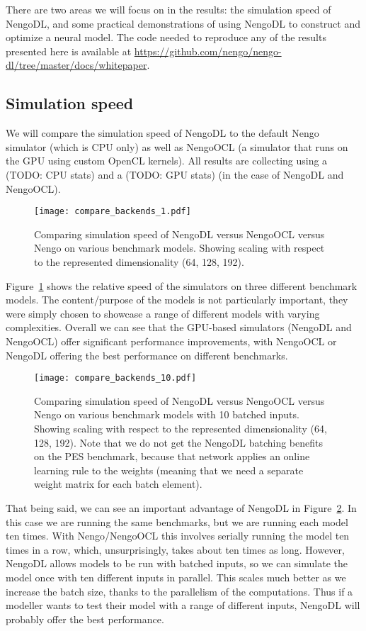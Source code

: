 \documentclass{article}
\begin{document}
There are two areas we will focus on in the results: the simulation speed of NengoDL, and some practical demonstrations of using NengoDL to construct and optimize a neural model.  The code needed to reproduce any of the results presented here is available at \url{https://github.com/nengo/nengo-dl/tree/master/docs/whitepaper}. 

\subsection{Simulation speed}

We will compare the simulation speed of NengoDL to the default Nengo simulator (which is CPU only) as well as NengoOCL (a simulator that runs on the GPU using custom OpenCL kernels).  All results are collecting using a (TODO: CPU stats) and a (TODO: GPU stats) (in the case of NengoDL and NengoOCL).

\begin{figure}
\centering
\texttt{[image: compare\_backends\_1.pdf]}
\caption{Comparing simulation speed of NengoDL versus NengoOCL versus Nengo on various benchmark models.  Showing scaling with respect to the represented dimensionality (64, 128, 192).}
\label{fig:compare_backends_1}
\end{figure}

Figure~\ref{fig:compare_backends_1} shows the relative speed of the simulators on three different benchmark models.  The content/purpose of the models is not particularly important, they were simply chosen to showcase a range of different models with varying complexities.  Overall we can see that the GPU-based simulators (NengoDL and NengoOCL) offer significant performance improvements, with NengoOCL or NengoDL offering the best performance on different benchmarks.

\begin{figure}
\centering
\texttt{[image: compare\_backends\_10.pdf]}
\caption{Comparing simulation speed of NengoDL versus NengoOCL versus Nengo on various benchmark models with 10 batched inputs.  Showing scaling with respect to the represented dimensionality (64, 128, 192).  Note that we do not get the NengoDL batching benefits on the PES benchmark, because that network applies an online learning rule to the weights (meaning that we need a separate weight matrix for each batch element).}
\label{fig:compare_backends_10}
\end{figure}

That being said, we can see an important advantage of NengoDL in Figure~\ref{fig:compare_backends_10}.  In this case we are running the same benchmarks, but we are running each model ten times.  With Nengo/NengoOCL this involves serially running the model ten times in a row, which, unsurprisingly, takes about ten times as long.  However, NengoDL allows models to be run with batched inputs, so we can simulate the model once with ten different inputs in parallel.  This scales much better as we increase the batch size, thanks to the parallelism of the computations.  Thus if a modeller wants to test their model with a range of different inputs, NengoDL will probably offer the best performance.
\end{document}
